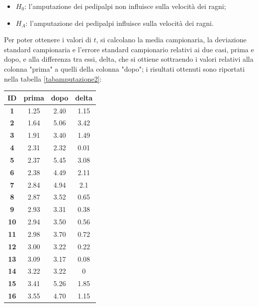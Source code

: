 \documentclass[10pt, draft]{book}
\newcounter{example}[section]
\begin{document}
\begin{example}
\begin{itemize}
        \item $H_0$: l'amputazione dei pedipalpi non influisce sulla velocità dei ragni;
        \item $H_A$: l'amputazione dei pedipalpi influisce sulla velocità dei ragni.
    \end{itemize}
    Per poter ottenere i valori di $t$, si calcolano la media campionaria, la deviazione standard campionaria e l'errore standard campionario relativi ai due casi, prima e dopo, e alla differenza tra essi, delta, che si ottiene sottraendo i valori relativi alla colonna "prima" a quelli della colonna "dopo"; i risultati ottenuti sono riportati nella tabella \ref{tabamputazione2}:
    \begin{table}[H]
        \centering
        \renewcommand\arraystretch{1.2}
        \begin{tabular}{c|c|c||c}
        \hline
        \textbf{ID} & \textbf{prima} & \textbf{dopo} & \textbf{delta}\\ 
        \hline
        \textbf{1} & 1.25 & 2.40 & 1.15\\
        \hline
        \textbf{2} & 1.64 & 5.06 & 3.42\\
        \hline
        \textbf{3} & 1.91 & 3.40 & 1.49\\
        \hline
        \textbf{4} & 2.31 & 2.32 & 0.01\\
        \hline
        \textbf{5} & 2.37 & 5.45 & 3.08\\
        \hline
        \textbf{6} & 2.38 & 4.49 & 2.11\\
        \hline
        \textbf{7} & 2.84 & 4.94 & 2.1\\
        \hline
        \textbf{8} & 2.87 & 3.52 & 0.65\\
        \hline
        \textbf{9} & 2.93 & 3.31 & 0.38\\
        \hline
        \textbf{10} & 2.94 & 3.50 & 0.56\\
        \hline
        \textbf{11} & 2.98 & 3.70 & 0.72\\
        \hline
        \textbf{12} & 3.00 & 3.22 & 0.22\\
        \hline
        \textbf{13} & 3.09 & 3.17 & 0.08\\
        \hline
        \textbf{14} & 3.22 & 3.22 & 0\\
        \hline
        \textbf{15} & 3.41 & 5.26 & 1.85\\
        \hline
        \textbf{16} & 3.55 & 4.70 & 1.15\\
        \hline
        \hline

\end{tabular}
\end{table}
\end{example}
\end{document}
